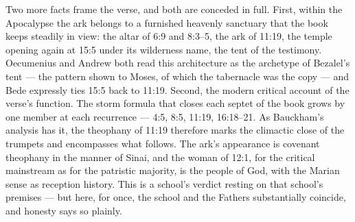 Two more facts frame the verse, and both are conceded in full. First,
within the Apocalypse the ark belongs to a furnished heavenly sanctuary
that the book keeps steadily in view: the altar of 6:9 and 8:3--5, the ark
of 11:19, the temple opening again at 15:5 under its wilderness name, the
tent of the testimony. Oecumenius and Andrew both read this architecture as
the archetype of Bezalel's tent --- the pattern shown to Moses, of which
the tabernacle was the copy --- and Bede expressly ties 15:5 back to 11:19.
Second, the modern critical account of the verse's function. The storm
formula that closes each septet of the book grows by one member at each
recurrence --- 4:5, 8:5, 11:19, 16:18--21. As Bauckham's analysis has it,
the theophany of 11:19 therefore marks the climactic close of the
trumpets and encompasses what follows. The ark's appearance is covenant
theophany in the manner of Sinai, and the woman of 12:1, for the critical
mainstream as for the patristic majority, is the people of God, with the
Marian sense as reception history. This is a school's verdict resting on
that school's premises --- but here, for once, the school and the Fathers
substantially coincide, and honesty says so plainly.

